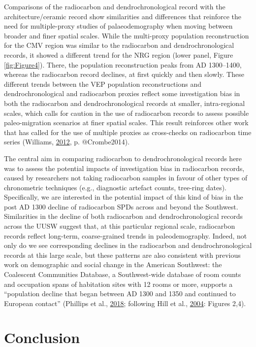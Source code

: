 \documentclass[
]{sa}
\begin{document}
Comparisons of the radiocarbon and dendrochronological record with the architecture/ceramic record show similarities and differences that reinforce the need for multiple-proxy studies of palaeodemography when moving between broader and finer spatial scales. While the multi-proxy population reconstruction for the CMV region was similar to the radiocarbon and dendrochronological records, it showed a different trend for the NRG region (lower panel, Figure \ref{fig:Figure4}). There, the population reconstruction peaks from AD 1300--1400, whereas the radiocarbon record declines, at first quickly and then slowly. These different trends between the VEP population reconstructions and dendrochronological and radiocarbon proxies reflect some investigation bias in both the radiocarbon and dendrochronological records at smaller, intra-regional scales, which calls for caution in the use of radiocarbon records to assess possible paleo-migration scenarios at finer spatial scales. This result reinforces other work that has called for the use of multiple proxies as cross-checks on radiocarbon time series (Williams, \protect\hyperlink{ref-Williams2012}{2012}, p. @Crombe2014).

The central aim in comparing radiocarbon to dendrochronological records here was to assess the potential impacts of investigation bias in radiocarbon records, caused by researchers not taking radiocarbon samples in favour of other types of chronometric techniques (e.g., diagnostic artefact counts, tree-ring dates). Specifically, we are interested in the potential impact of this kind of bias in the post AD 1300 decline of radiocarbon SPDs across and beyond the Southwest. Similarities in the decline of both radiocarbon and dendrochronological records across the UUSW suggest that, at this particular regional scale, radiocarbon records reflect long-term, coarse-grained trends in paleodemography. Indeed, not only do we see corresponding declines in the radiocarbon and dendrochronological records at this large scale, but these patterns are also consistent with previous work on demographic and social change in the American Southwest: the Coalescent Communities Database, a Southwest-wide database of room counts and occupation spans of habitation sites with 12 rooms or more, supports a ``population decline that began between AD 1300 and 1350 and continued to European contact'' (Phillips et al., \protect\hyperlink{ref-Phillips2018}{2018}; following Hill et al., \protect\hyperlink{ref-Hill2004}{2004}: Figures 2,4).

\hypertarget{conclusion}{%
\section*{Conclusion}\label{conclusion}}
\end{document}
